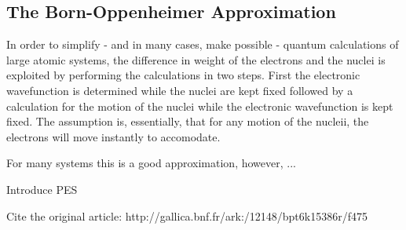 \subsection{The Born-Oppenheimer Approximation}
\label{sec:born-oppenheimer}

In order to simplify - and in many cases, make possible - quantum calculations of large atomic systems, the difference in weight of the electrons and the nuclei is exploited by performing the calculations in two steps.
First the electronic wavefunction is determined while the nuclei are kept fixed followed by a calculation for the motion of the nuclei while the electronic wavefunction is kept fixed.
The assumption is, essentially, that for any motion of the nucleii, the electrons will move instantly to accomodate.

For many systems this is a good approximation, however, ...

\bit
\item Introduce PES
\item Cite the original article: http://gallica.bnf.fr/ark:/12148/bpt6k15386r/f475
\eit

\incomplete
